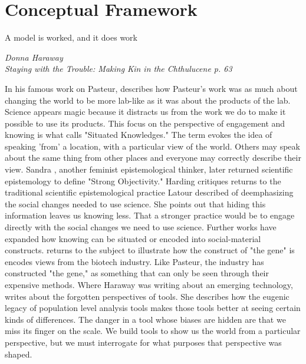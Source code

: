 \documentclass[a4paper,man,natbib]{apa6}
\begin{document}

   
   \section*{Conceptual Framework}
   \epigraph{A model is worked, and it does work}{\textit{Donna Haraway \\ Staying with the Trouble: Making Kin in the Chthulucene p. 63}}

   In his famous work on Pasteur, \citet{Latour1983-bs} describes how Pasteur's work was as much about changing the world to be more lab-like as it was about the products of the lab. Science appears magic because it distracts us from the work we do to make it possible to use its products. This focus on the perspective of engagement and knowing is what \citet{Haraway1988-nh} calls "Situated Knowledges." The term evokes the idea of speaking 'from' a location, with a particular view of the world. Others may speak about the same thing from other places and everyone may correctly describe their view. Sandra \citet{Harding1992-od}, another feminist epistemological thinker, later returned scientific epistemology to define "Strong Objectivity." Harding critiques returns to the traditional scientific epistemological practice Latour described of deemphasizing the social changes needed to use science. She points out that hiding this information leaves us knowing less. That a stronger practice would be to engage directly with the social changes we need to use science.
   \medskip
   Further works have expanded how knowing can be situated or encoded into social-material constructs. \citet{Harraway1997-va} returns to the subject to illustrate how the construct of "the gene" is encodes views from the biotech industry. Like Pasteur, the industry has constructed "the gene," as something that can only be seen through their expensive methods. Where Haraway was writing about an emerging technology, \citet{Subramaniam2014-wg} writes about the forgotten perspectives of tools. She describes how the eugenic legacy of population level analysis tools makes those tools better at seeing certain kinds of differences. The danger in a tool whose biases are hidden are that we miss its finger on the scale. We build tools to show us the world from a particular perspective, but we must interrogate for what purposes that perspective was shaped.
\end{document}
